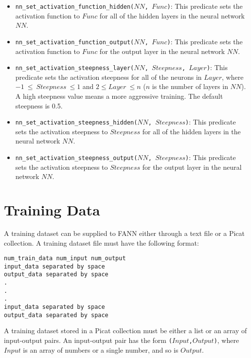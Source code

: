 \begin{itemize}
\item \texttt{nn\_set\_activation\_function\_hidden($NN$, $Func$)}: This predicate sets the activation function to $Func$ for all of the hidden layers in the neural network $NN$.

\item \texttt{nn\_set\_activation\_function\_output($NN$, $Func$)}: This predicate sets the activation function to $Func$ for the output layer in the neural network $NN$.

\item \texttt{nn\_set\_activation\_steepness\_layer($NN$, $Steepness$, $Layer$)}: This predicate sets the activation steepness for all of the neurons in $Layer$, where $-1\ \le\ Steepness\ \le 1$ and $2 \le Layer\ \le n$ ($n$ is the number of layers in $NN$).  A high steepness value means a more aggressive training. The default steepness is 0.5.

\item \texttt{nn\_set\_activation\_steepness\_hidden($NN$, $Steepness$)}: This predicate sets the activation steepness to $Steepness$ for all of the hidden layers in the neural network $NN$.

\item \texttt{nn\_set\_activation\_steepness\_output($NN$, $Steepness$)}: This predicate sets the activation steepness to $Steepness$ for the output layer in the neural network $NN$.
\end{itemize}

\section{Training Data}
A training dataset can be supplied to FANN either through a text file or a Picat collection. A training dataset file must have the following format:

\begin{verbatim}
num_train_data num_input num_output
input_data separated by space
output_data separated by space
.
.
.
input_data separated by space
output_data separated by space
\end{verbatim}
A training dataset stored in a Picat collection must be either a list or an array of input-output pairs. An input-output pair has the form \texttt{($Input$,$Output$)}, where $Input$ is an array of numbers or a single number, and so is $Output$.

